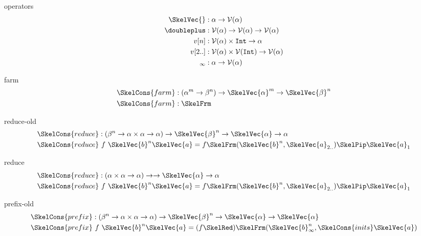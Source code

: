 \documentclass[preview]{standalone}
\begin{document}
\begin{docimage}{operators}
  \begin{align}%
  \SkelVec{ } &: \alpha \rightarrow \mathcal{V}(\alpha) \\
  \doubleplus &: \mathcal{V}(\alpha) \rightarrow \mathcal{V}(\alpha) \rightarrow \mathcal{V}(\alpha)\\
  v[n]         &: \mathcal{V}(\alpha) \times \mathtt{Int} \rightarrow \alpha \\
  v[2..]       &: \mathcal{V}(\alpha) \times \mathcal{V}(\mathtt{Int}) \rightarrow \mathcal{V}(\alpha) \\
  _{\infty}     &: \alpha \rightarrow \mathcal{V}(\alpha)%
\end{align}
\end{docimage}

\begin{docimage}{farm}
  \begin{align*}%
    \SkelCons{farm} &: (\alpha^m \rightarrow \beta^n) \rightarrow \SkelVec{\alpha}^m \rightarrow \SkelVec{\beta}^n \\
    \SkelCons{farm} &: \SkelFrm
  \end{align*}
\end{docimage}

\begin{docimage}{reduce-old}
  \begin{align*}%
    \SkelCons{reduce} &: (\beta^n \rightarrow \alpha \times \alpha \rightarrow \alpha)
                        \rightarrow \SkelVec{\beta}^n  \rightarrow \SkelVec{\alpha} \rightarrow \alpha \\
    \SkelCons{reduce} &\ f\ \SkelVec{b}^n \SkelVec{a}= f \SkelFrm (\SkelVec{b}^n,\SkelVec{a}_{2..}) \SkelPip \SkelVec{a}_{1}
  \end{align*}
\end{docimage}

\begin{docimage}{reduce}
  \begin{align*}%
    \SkelCons{reduce} &: (\alpha \times \alpha \rightarrow \alpha)
                        \rightarrow \rightarrow \SkelVec{\alpha} \rightarrow \alpha \\
    \SkelCons{reduce} &\ f\ \SkelVec{b}^n \SkelVec{a}= f \SkelFrm (\SkelVec{b}^n,\SkelVec{a}_{2..}) \SkelPip \SkelVec{a}_{1}
  \end{align*}
\end{docimage}


\begin{docimage}{prefix-old}
  \begin{align*}%
    \SkelCons{prefix} &: (\beta^n \rightarrow \alpha \times \alpha \rightarrow \alpha)
                        \rightarrow \SkelVec{\beta}^n  \rightarrow \SkelVec{\alpha} \rightarrow \SkelVec{\alpha} \\
    \SkelCons{prefix} &\ f\ \SkelVec{b}^n \SkelVec{a}= (f \SkelRed) \SkelFrm (\SkelVec{b}^n_\infty, \SkelCons{inits} \SkelVec{a})
  \end{align*}
\end{docimage}
\end{document}
